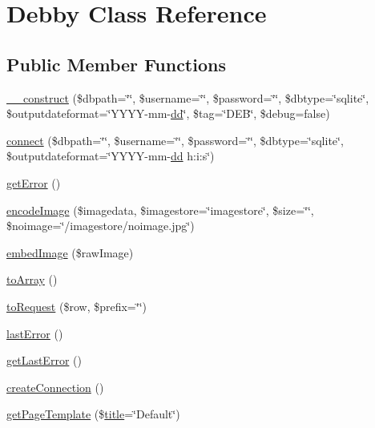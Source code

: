 \hypertarget{classDebby}{}\section{Debby Class Reference}
\label{classDebby}
\subsection*{Public Member Functions}
\begin{DoxyCompactItemize}
\item 
\hyperlink{classDebby_a2dd53fded0dd64090ac538ef66d15bf1}{\+\_\+\+\_\+construct} (\$dbpath=\char`\"{}\char`\"{}, \$username=\char`\"{}\char`\"{}, \$password=\char`\"{}\char`\"{}, \$dbtype=\char`\"{}sqlite\char`\"{}, \$outputdateformat=\char`\"{}Y\+Y\+Y\+Y-\/mm-\/\hyperlink{Shape_8php_ab8bded9253c481cadc72d4df086e52b7}{dd}\char`\"{}, \$tag=\char`\"{}D\+E\+B\char`\"{}, \$debug=false)
\item 
\hyperlink{classDebby_a9f4e15cca354aa036ac823884c69cb61}{connect} (\$dbpath=\char`\"{}\char`\"{}, \$username=\char`\"{}\char`\"{}, \$password=\char`\"{}\char`\"{}, \$dbtype=\char`\"{}sqlite\char`\"{}, \$outputdateformat=\char`\"{}Y\+Y\+Y\+Y-\/mm-\/\hyperlink{Shape_8php_ab8bded9253c481cadc72d4df086e52b7}{dd} h\+:i\+:s\char`\"{})
\item 
\hyperlink{classDebby_ae9d2704d501f1950be4bf08e4aecc3e7}{get\+Error} ()
\item 
\hyperlink{classDebby_a0480262858a16cfc6e4cfe19b0e29e62}{encode\+Image} (\$imagedata, \$imagestore=\char`\"{}imagestore\char`\"{}, \$size=\char`\"{}\char`\"{}, \$noimage=\char`\"{}/imagestore/noimage.\+jpg\char`\"{})
\item 
\hyperlink{classDebby_af57d83562218d3a4b5e1de2f75a24cf0}{embed\+Image} (\$raw\+Image)
\item 
\hyperlink{classDebby_a4f0f3450a38e497552248a570b395353}{to\+Array} ()
\item 
\hyperlink{classDebby_a07e4bf3f7c9fa77beb52a09a38e936c8}{to\+Request} (\$row, \$prefix=\char`\"{}\char`\"{})
\item 
\hyperlink{classDebby_acbb276a47dbcd64d671a673df43be15a}{last\+Error} ()
\item 
\hyperlink{classDebby_ae10ec43fb6945948e4c936d798cc3bb3}{get\+Last\+Error} ()
\item 
\hyperlink{classDebby_a4cf1bbf921e33fee254129eb77fa4854}{create\+Connection} ()
\item 
\hyperlink{classDebby_ab4c3e5d14a404d1fdd6bc4ab078d64b8}{get\+Page\+Template} (\$\hyperlink{Shape_8php_ad264ad0cabbe965bf7f7c8a5ed6abebb}{title}=\char`\"{}Default\char`\"{})

\end{DoxyCompactItemize}
